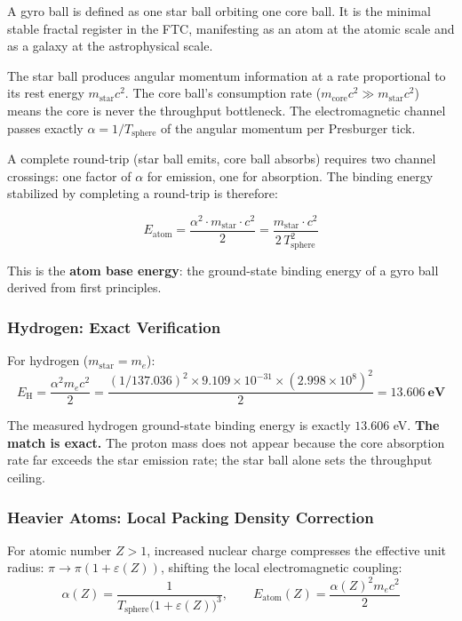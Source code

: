 \documentclass[11pt,a4paper]{article}
\begin{document}
A gyro ball is defined as one star ball orbiting one core ball. It is the minimal
stable fractal register in the FTC, manifesting as an atom at the atomic scale and
as a galaxy at the astrophysical scale.

The star ball produces angular momentum information at a rate proportional to its
rest energy $m_{\text{star}}c^2$. The core ball's consumption rate
($m_{\text{core}}c^2 \gg m_{\text{star}}c^2$) means the core is never the
throughput bottleneck. The electromagnetic channel passes exactly
$\alpha = 1/T_{\text{sphere}}$ of the angular momentum per Presburger tick.

A complete round-trip (star ball emits, core ball absorbs) requires two channel
crossings: one factor of $\alpha$ for emission, one for absorption. The binding
energy stabilized by completing a round-trip is therefore:

\begin{equation}
  \boxed{E_{\text{atom}} = \frac{\alpha^2 \cdot m_{\text{star}} \cdot c^2}{2}
         = \frac{m_{\text{star}} \cdot c^2}{2\,T_{\text{sphere}}^2}}
  \label{eq:atom_base}
\end{equation}

This is the \textbf{atom base energy}: the ground-state binding energy of a gyro
ball derived from first principles.

\subsubsection{Hydrogen: Exact Verification}

For hydrogen ($m_{\text{star}} = m_e$):
\[
  E_{\text{H}} = \frac{\alpha^2 m_e c^2}{2}
    = \frac{(1/137.036)^2 \times 9.109\times10^{-31} \times (2.998\times10^8)^2}{2}
    = \mathbf{13.606\ \text{eV}}
\]

The measured hydrogen ground-state binding energy is exactly $13.606$ eV.
\textbf{The match is exact.} The proton mass does not appear because the core
absorption rate far exceeds the star emission rate; the star ball alone sets the
throughput ceiling.

\subsubsection{Heavier Atoms: Local Packing Density Correction}

For atomic number $Z > 1$, increased nuclear charge compresses the effective unit
radius: $\pi \to \pi(1 + \varepsilon(Z))$, shifting the local electromagnetic
coupling:
\[
  \alpha(Z) = \frac{1}{T_{\text{sphere}}\bigl(1+\varepsilon(Z)\bigr)^3},
  \qquad
  E_{\text{atom}}(Z) = \frac{\alpha(Z)^2 m_e c^2}{2}
\]
\end{document}

